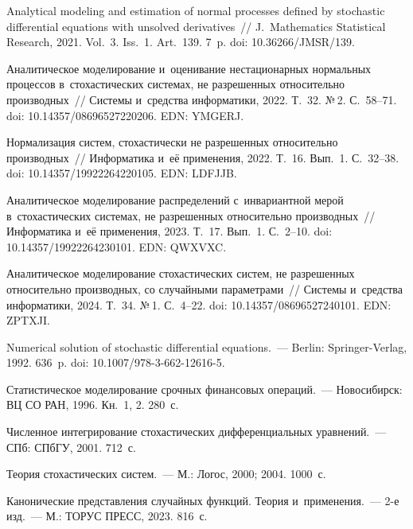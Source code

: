 \begin{multicols}{2}
{{\begin{thebibliography}{99}
Analytical modeling and estimation of normal processes defined by stochastic 
differential equations with unsolved derivatives~// J.~Mathematics  
Statistical Research, 2021. Vol.~3. Iss.~1. Art.~139. 7~p. doi: 
10.36266/\linebreak JMSR/139.

Аналитическое моделирование и~оценивание нестационарных нормальных процессов 
в~стохастических сис\-те\-мах, не разрешенных относительно производных~// Системы и~средства 
информатики, 2022. Т.~32. №\,2. С.~58--71. doi: 10.14357/08696527220206. EDN: YMGERJ.


Нормализация систем, стохастически не разрешенных относительно производных~// 
Информатика и~её применения, 2022. Т.~16. Вып.~1. С.~32--38. doi: 10.14357/19922264220105. EDN: \mbox{LDFJJB}.

Аналитическое моделирование распределений с~инвариантной мерой в~стохастических 
системах, не разрешенных относительно производных~// Информатика и~её 
применения, 2023. Т.~17. Вып.~1. С.~2--10. doi: 10.14357/19922264230101. EDN: QWXVXC.

Аналитическое моделирование стохастических систем, не разрешенных относительно 
производных, со случайными параметрами~// Системы и~средства информатики, 2024. 
Т.~34. №\,1. С.~4--22. doi: 10.14357/08696527240101. EDN: ZPTXJI.

Numerical solution of stochastic differential equations.~--- Berlin: Springer-Verlag, 1992. 636~p.
doi: 10.1007/978-3-662-12616-5.

Статистическое моделирование срочных финансовых операций.~--- Новосибирск: ВЦ СО 
РАН, 1996. Кн.~1, 2. 280~с.

Численное интегрирование стохастических дифференциальных уравнений.~--- СПб: 
\mbox{СПбГУ}, 2001. 712~с.

Теория стохастических систем.~--- М.: Логос, 2000; 2004. 1000~с.


Канонические представления случайных функций. Теория и~применения.~--- 2-е изд.~--- М.: ТОРУС ПРЕСС, 2023. 816~с.
\end{thebibliography}

 }
 }

\end{multicols}

